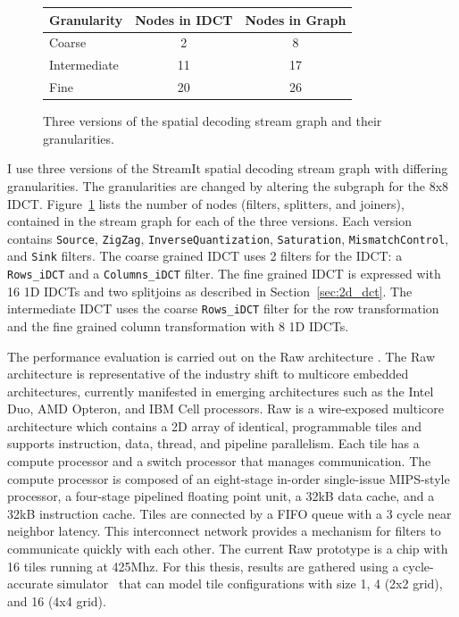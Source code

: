 \begin{figure}[h]
 \begin{center}
  \begin{tabular}{|l|c|c|}
\hline
Granularity & Nodes in IDCT & Nodes in Graph\\
\hline
Coarse & 2 & 8 \\
Intermediate & 11 & 17\\
Fine & 20 & 26\\
\hline
  \end{tabular}
  \end{center}
 \caption{Three versions of the spatial decoding stream graph and their granularities.}
 \label{table:decoding_graphs}
\end{figure}

I use three versions of the StreamIt spatial decoding stream graph with
differing granularities. The granularities are changed by altering the subgraph
for the 8x8 IDCT. Figure~\ref{table:decoding_graphs} lists the number of nodes
(filters, splitters, and joiners), contained in the stream graph for each
of the three versions.
Each version contains \texttt{Source}, \texttt{ZigZag}, 
\texttt{InverseQuantization}, \texttt{Saturation}, \texttt{MismatchControl}, and
\texttt{Sink} filters. The coarse grained IDCT uses 2 filters for the IDCT: 
a \texttt{Rows\_iDCT} and a \texttt{Columns\_iDCT} filter. The fine grained
IDCT is expressed with 16 1D IDCTs and two splitjoins as described 
in Section~\ref{sec:2d_dct}. 
The intermediate IDCT uses the coarse \texttt{Rows\_iDCT} filter for the row
transformation and the fine grained column transformation with 8 1D IDCTs.

The performance evaluation is carried out on the Raw architecture
\cite{taylor:micro:2002, taylor:isca:2004}.
The Raw architecture is representative of the industry shift to multicore
embedded architectures, currently manifested in emerging architectures
such as the Intel Duo, AMD Opteron, and IBM Cell processors.
Raw is a wire-exposed multicore architecture which contains a 2D array of identical,
programmable tiles 
and supports instruction, data, thread, and pipeline parallelism. 
Each tile has a compute processor and a switch processor that
manages communication. The compute processor is composed of an eight-stage
in-order single-issue MIPS-style processor, a four-stage pipelined floating point unit,
a 32kB data cache, and a 32kB instruction cache. 
Tiles are connected by a FIFO queue 
with a 3 cycle near neighbor latency. This interconnect
network provides a mechanism for filters to communicate quickly with each other.
The current Raw prototype is a chip with 16 tiles running at 425Mhz. 
For this thesis, results are gathered using
a cycle-accurate simulator~\cite{taylor:isca:2004} that can model tile configurations
with size
1, 4 (2x2 grid), and 16 (4x4 grid). 

